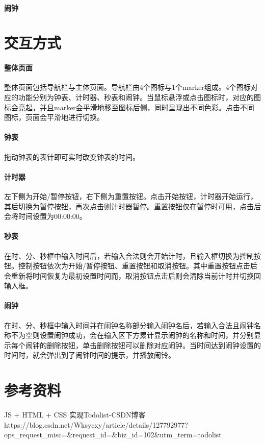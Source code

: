 \documentclass[UTF8]{ctexart}
\begin{document}
	\paragraph{闹钟}
	
	
	\section{交互方式} %
	\paragraph{整体页面}
	整体页面包括导航栏与主体页面。导航栏由4个图标与1个marker组成。4个图标对应的功能分别为钟表、计时器、秒表和闹钟。当鼠标悬浮或点击图标时，对应的图标会亮起，并且marker会平滑地移至图标后侧，同时呈现出不同色彩。点击不同图标，页面会平滑地进行切换。
	\paragraph{钟表}
	拖动钟表的表针即可实时改变钟表的时间。

	\paragraph{计时器}
	左下侧为开始/暂停按钮，右下侧为重置按钮。点击开始按钮，计时器开始运行，其后切换为暂停按钮，再次点击则计时器暂停。重置按钮仅在暂停时可用，点击后会将时间设置为00:00:00。
	\paragraph{秒表}
	在时、分、秒框中输入时间后，若输入合法则会开始计时，且输入框切换为控制按钮。控制按钮依次为开始/暂停按钮、重置按钮和取消按钮。其中重置按钮点击后会重新将时间恢复为最初设置时间而，取消按钮点击后则会清除当前计时并切换回输入框。
	\paragraph{闹钟}
	在时、分、秒框中输入时间并在闹钟名称部分输入闹钟名后，若输入合法且闹钟名称不为空则设置闹钟成功，会在输入区下方累计显示闹钟的名称和时间，并分别显示每个闹钟的删除按钮，单击删除按钮可以删除对应闹钟。当时间达到闹钟设置的时间时，就会弹出到了闹钟时间的提示，并播放闹铃。
	

	
	\section{参考资料} %
	JS + HTML + CSS 实现Todolist-CSDN博客https://blog.csdn.net/Wksycxy/article/details/127792977?ops_request_misc=&request_id=&biz_id=102&utm_term=todolist
\end{document}
